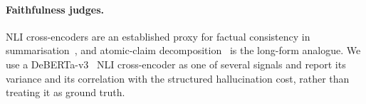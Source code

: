 \paragraph{Faithfulness judges.}
NLI cross-encoders are an established proxy for factual consistency in summarisation~\cite{kryscinski2020factcc,laban2022summac,zha2023alignscore}, and atomic-claim decomposition~\cite{min2023factscore} is the long-form analogue.
We use a DeBERTa-v3~\cite{he2023debertav3} NLI cross-encoder as one of several signals and report its variance and its correlation with the structured hallucination cost, rather than treating it as ground truth.
